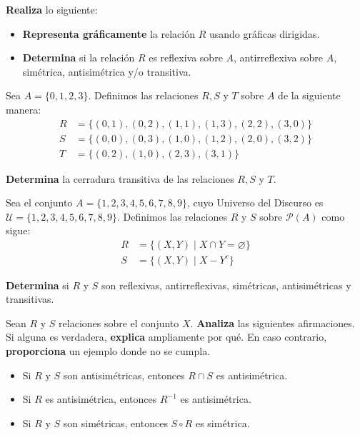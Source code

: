 \documentclass[oneside]{style}
\begin{document}
\begin{questions}[label=\protect\circled{\bfseries\arabic*}]
{        \textbf{Realiza} lo siguiente:
        \begin{itemize}
            \item \textbf{Representa gráficamente} la relación $R$ usando 
            gráficas dirigidas.
            \item \textbf{Determina} si la relación $R$ es reflexiva sobre $A$, 
            antirreflexiva sobre $A$, simétrica, antisimétrica y/o transitiva.
        \end{itemize}
    }

    \question
    {
        Sea $A = \{0,1,2,3\}$. Definimos las relaciones $R, S$ y $T$ sobre $A$
        de la siguiente manera:
        \begin{align*}
            R &= \{(0,1), (0,2), (1,1), (1,3), (2,2), (3,0)\} \\ 
            S &= \{(0,0), (0,3), (1,0), (1,2), (2,0), (3,2)\} \\ 
            T &= \{(0,2), (1,0), (2,3), (3,1)\}
        \end{align*}

        \textbf{Determina} la cerradura transitiva de las relaciones $R, S$ y 
        $T$.
    }

    \question
    {
        Sea el conjunto $A = \{1,2,3,4,5,6,7,8,9\}$, cuyo Universo del Discurso 
        es $\mathcal{U} = \{1,2,3,4,5,6,7,8,9\}$. Definimos las relaciones $R$ y 
        $S$ sobre $\mathcal{P}(A)$ como sigue:
        \begin{align*}
            R &= \{(X, Y) \; | \; X \cap Y = \varnothing\} \\ 
            S &= \{(X, Y) \; | \; X - Y^c\}
        \end{align*}
        
        \textbf{Determina} si $R$ y $S$ son reflexivas, antirreflexivas, 
        simétricas, antisimétricas y transitivas. 
    }

    \newpage
    \question
    {
        Sean $R$ y $S$ relaciones sobre el conjunto $X$. \textbf{Analiza} las 
        siguientes afirmaciones. Si alguna es verdadera, \textbf{explica} 
        ampliamente por qué. En caso contrario, \textbf{proporciona} un ejemplo 
        donde no se cumpla. 
        \begin{itemize}
            \item Si $R$ y $S$ son antisimétricas, entonces $R \cap S$ es 
            antisimétrica.
            \item Si $R$ es antisimétrica, entonces $R^{-1}$ es antisimétrica. 
            \item Si $R$ y $S$ son simétricas, entonces $S \circ R$ es simétrica.
        \end{itemize}
    }


\end{questions}
\end{document}
